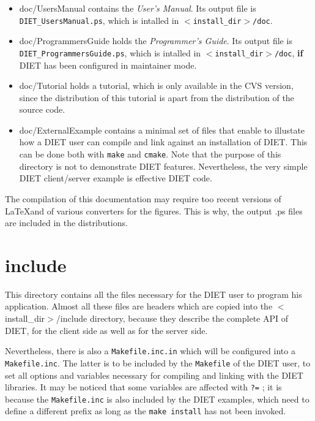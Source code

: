   \begin{itemize}
  \item \textsf{doc/UsersManual} contains the \textit{User's Manual}. 
     Its output file is \texttt{DIET\_UsersManual.ps}, which is intalled in
     \texttt{$<$install\_dir$>$/doc}.
  \item \textsf{doc/ProgrammersGuide} holds the \textit{Programmer's Guide}.
     Its output file is \texttt{DIET\_ProgrammersGuide.ps}, which is intalled
     in \texttt{$<$install\_dir$>$/doc}, \textbf{if} DIET has been configured
     in maintainer mode.
  \item \textsf{doc/Tutorial} holds a tutorial, which is only available
     in the CVS version, since the distribution of this tutorial is apart
     from the distribution of the source code.
  \item \textsf{doc/ExternalExample} contains a minimal set of files
     that enable to illustate how a DIET user can compile and link
     against an installation of DIET.
     This can be done both with \verb+make+ and \verb+cmake+.
     Note that the purpose of this directory is not to demonstrate
     DIET features.
     Nevertheless, the very simple DIET client/server example is effective
     DIET code.
  \end{itemize}

  The compilation of this documentation may require too recent versions of
  \LaTeX and of various converters for the figures.
  This is why, the output \textsf{.ps} files are included in the distributions.

  \section{\textsf{include}}
  \label{s:include}

  This directory contains all the files necessary for the DIET user to program his
  application. Almost all these files are headers which are copied into the
  \textsf{$<$install\_dir$>$/include} directory, because they describe the
  complete API of DIET, for the client side as well as for the server side.

  Nevertheless, there is also a \texttt{Makefile.inc.in} which will be configured
  into a \texttt{Makefile.inc}.
  The latter is to be included by the \texttt{Makefile} of the
  DIET user, to set all options and variables necessary for compiling and
  linking with the DIET libraries.
  It may be noticed that some variables are affected with
  \texttt{?=} ; it is because the \texttt{Makefile.inc} is also included by the
  DIET examples, which need to define a different prefix as long as the
  \texttt{make install} has not been invoked.



